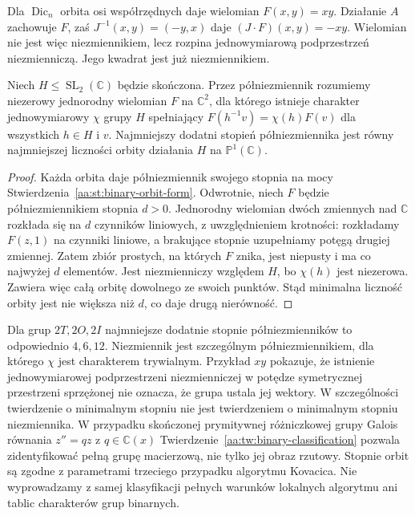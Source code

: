 \begin{przyklad}
Dla $\operatorname{Dic}_n$ orbita osi współrzędnych
daje wielomian $F(x,y)=xy$.
Działanie $A$ zachowuje $F$, zaś
$J^{-1}(x,y)=(-y,x)$ daje $(J\cdot F)(x,y)=-xy$.
Wielomian nie jest więc niezmiennikiem, lecz rozpina
jednowymiarową podprzestrzeń niezmienniczą.
Jego kwadrat jest już niezmiennikiem.
\end{przyklad}

\begin{twierdzenie}
\label{aa:tw:binary-min-semi-invariant}
Niech $H\le\operatorname{SL}_2(\mathbb C)$ będzie skończona.
Przez półniezmiennik rozumiemy niezerowy jednorodny
wielomian $F$ na $\mathbb C^2$, dla którego istnieje
charakter jednowymiarowy $\chi$ grupy $H$ spełniający
$F(h^{-1}v)=\chi(h)F(v)$ dla wszystkich $h\in H$ i $v$.
Najmniejszy dodatni stopień półniezmiennika jest równy
najmniejszej liczności orbity działania $H$ na
$\mathbb P^1(\mathbb C)$.
\end{twierdzenie}
\begin{proof}
Każda orbita daje półniezmiennik swojego stopnia
na mocy Stwierdzenia~\ref{aa:st:binary-orbit-form}.
Odwrotnie, niech $F$ będzie półniezmiennikiem stopnia
$d>0$. Jednorodny wielomian dwóch zmiennych nad
$\mathbb C$ rozkłada się na $d$ czynników liniowych,
z uwzględnieniem krotności: rozkładamy $F(z,1)$
na czynniki liniowe, a brakujące stopnie uzupełniamy
potęgą drugiej zmiennej. Zatem zbiór prostych,
na których $F$ znika, jest niepusty i ma co najwyżej
$d$ elementów. Jest niezmienniczy względem $H$,
bo $\chi(h)$ jest niezerowa. Zawiera więc całą orbitę
dowolnego ze swoich punktów. Stąd minimalna liczność
orbity jest nie większa niż $d$, co daje drugą nierówność.
\end{proof}

Dla grup $2T,2O,2I$ najmniejsze dodatnie stopnie
półniezmienników to odpowiednio $4,6,12$.
Niezmiennik jest szczególnym półniezmiennikiem,
dla którego $\chi$ jest charakterem trywialnym.
Przykład $xy$ pokazuje, że istnienie jednowymiarowej
podprzestrzeni niezmienniczej w potędze symetrycznej
przestrzeni sprzężonej nie oznacza, że grupa ustala
jej wektory. W szczególności twierdzenie o minimalnym
stopniu nie jest twierdzeniem o minimalnym stopniu
niezmiennika.
W przypadku skończonej prymitywnej różniczkowej
grupy Galois równania $z''=qz$ z $q\in\mathbb C(x)$
Twierdzenie~\ref{aa:tw:binary-classification} pozwala
zidentyfikować pełną grupę macierzową, nie tylko jej
obraz rzutowy. Stopnie orbit są zgodne z parametrami
trzeciego przypadku algorytmu Kovacica.
Nie wyprowadzamy z samej klasyfikacji pełnych
warunków lokalnych algorytmu ani tablic charakterów
grup binarnych.
